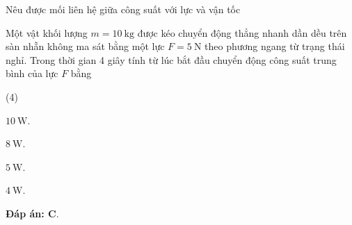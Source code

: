 \begin{dang}{Nêu được mối liên hệ giữa công suất với lực và vận tốc}
{		Một vật khối lượng $m=\SI{10}{\kilogram}$ được kéo chuyển động thẳng nhanh dần dều trên sàn nhẵn không ma sát bằng một lực $F=\SI{5}{\newton}$ theo phương ngang từ trạng thái nghỉ. Trong thời gian 4 giây tính từ lúc bắt đầu chuyển động công suất trung bình của lực $F$ bằng
		\begin{mcq}(4)
			\item $\SI{10}{\watt}$.
			\item $\SI{8}{\watt}$.
			\item $\SI{5}{\watt}$.
			\item $\SI{4}{\watt}$.
		\end{mcq}
		
		\textbf{Đáp án: C}.
	}
\end{dang}

